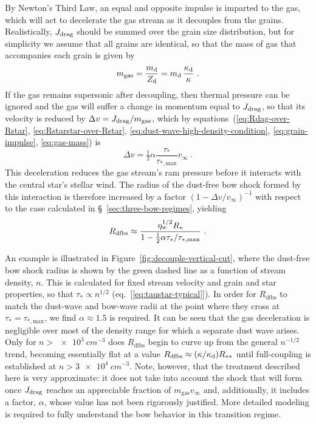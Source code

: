By Newton's Third Law, an equal and opposite impulse is imparted to
the gas, which will act to decelerate the gas stream as it decouples
from the grains.  Realistically, \(J_{\text{drag}}\) should be summed over the
grain size distribution, but for simplicity we assume that all grains
are identical, so that the mass of gas that accompanies each grain is
given by
\begin{equation}
  \label{eq:gas-mass}
  m_{\text{gas}} = \frac{m_{\text{d}}}{Z_{\text{d}}} =  m_{\text{d}} \, \frac{\kappa_{\text{d}}}{\kappa} \ . 
\end{equation}
If the gas remains supersonic after decoupling, then thermal pressure
can be ignored and the gas will suffer a change in momentum equal to
\(J_{\text{drag}}\), so that its velocity is reduced by
\(\Delta v = J_{\text{drag}} / m_{\text{gas}}\), which by
equations~(\ref{eq:Rdag-over-Rstar}, \ref{eq:Rstarstar-over-Rstar},
\ref{eq:dust-wave-high-density-condition}, \ref{eq:grain-impulse},
\ref{eq:gas-mass}) is
\begin{equation}
  \label{eq:gas-dv}
  \Delta v = \tfrac12 \alpha \frac{\tau_*}{\tau_{*, \text{max}}} v_\infty\ .
\end{equation}
This deceleration reduces the gas stream's ram pressure before it
interacts with the central star's stellar wind.  The radius of the
dust-free bow shock formed by this interaction is therefore increased
by a factor \((1 - \Delta v / v_\infty)^{-1}\) with respect to the case
calculated in \S~\ref{sec:three-bow-regimes}, yielding
\begin{equation}
  \label{eq:gas-free-bow-shock}
  R_{\text{dfbs}} \approx \frac{\eta_{\text{w}}^{1/2} R_*}{1 - \tfrac12 \alpha \tau_* / \tau_{*, \text{max}}} \ .
\end{equation}

An example is illustrated in Figure~\ref{fig:decouple-vertical-cut},
where the dust-free bow shock radius is shown by the green dashed line
as a function of stream density, \(n\).  This is calculated for fixed
stream velocity and grain and star properties, so that
\(\tau_* \propto n^{1/2}\) (eq.~[\ref{eq:taustar-typical}]).  In order for
\(R_{\text{dfbs}}\) to match the dust-wave and bow-wave radii at the
point where they cross at \(\tau_* = \tau_{*, \text{max}}\), we find
\(\alpha \approx 1.5\) is required.  It can be seen that the gas deceleration is
negligible over most of the density range for which a separate dust
wave arises.  Only for \(n > \SI{e3}{cm^{-3}}\) does
\(R_{\text{dfbs}}\) begin to curve up from the general \(n^{-1/2}\)
trend, becoming essentially flat at a value
\(R_{\text{dfbs}} \approx (\kappa/\kappa_{\text{d}}) R_{**}\) until full-coupling is
established at \(n > \SI{3e4}{cm^{-3}}\).  Note, however, that the
treatment described here is very approximate: it does not take into
account the shock that will form once \(J_{\text{drag}}\) reaches an
appreciable fraction of \(m_{\text{gas}} v_\infty\) and, additionally, it
includes a factor, \(\alpha\), whose value has not been rigorously
justified.  More detailed modeling is required to fully understand the
bow behavior in this transition regime.




